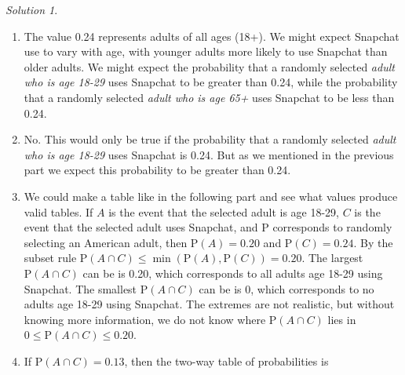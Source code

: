 \documentclass[
  letterpaper,
  DIV=11,
  numbers=noendperiod]{scrreprt}
\theoremstyle{plain}
\theoremstyle{definition}
\theoremstyle{definition}
\theoremstyle{definition}
\theoremstyle{remark}
\newtheorem{refsolution}{Solution}[chapter]
\begin{document}

\begin{tcolorbox}[enhanced jigsaw, opacityback=0, rightrule=.15mm, coltitle=black, colframe=quarto-callout-tip-color-frame, toprule=.15mm, colbacktitle=quarto-callout-tip-color!10!white, opacitybacktitle=0.6, left=2mm, toptitle=1mm, breakable, title={Solution (click to expand)}, bottomtitle=1mm, colback=white, leftrule=.75mm, titlerule=0mm, arc=.35mm, bottomrule=.15mm]

\begin{refsolution}
\leavevmode

\begin{enumerate}
\def\labelenumi{\arabic{enumi}.}
\item
  The value 0.24 represents adults of all ages (18+). We might expect
  Snapchat use to vary with age, with younger adults more likely to use
  Snapchat than older adults. We might expect the probability that a
  randomly selected \emph{adult who is age 18-29} uses Snapchat to be
  greater than 0.24, while the probability that a randomly selected
  \emph{adult who is age 65+} uses Snapchat to be less than 0.24.
\item
  No. This would only be true if the probability that a randomly
  selected \emph{adult who is age 18-29} uses Snapchat is 0.24. But as
  we mentioned in the previous part we expect this probability to be
  greater than 0.24.
\item
  We could make a table like in the following part and see what values
  produce valid tables. If \(A\) is the event that the selected adult is
  age 18-29, \(C\) is the event that the selected adult uses Snapchat,
  and \(\textrm{P}\) corresponds to randomly selecting an American
  adult, then \(\textrm{P}(A) = 0.20\) and \(\textrm{P}(C) = 0.24\). By
  the subset rule
  \(\textrm{P}(A\cap C)\le \min(\textrm{P}(A), \textrm{P}(C)) = 0.20\).
  The largest \(\textrm{P}(A\cap C)\) can be is 0.20, which corresponds
  to all adults age 18-29 using Snapchat. The smallest
  \(\textrm{P}(A \cap C)\) can be is 0, which corresponds to no adults
  age 18-29 using Snapchat. The extremes are not realistic, but without
  knowing more information, we do not know where \(\textrm{P}(A\cap C)\)
  lies in \(0\le \textrm{P}(A \cap C) \le 0.20\).\\
\item
  If \(\textrm{P}(A \cap C)= 0.13\), then the two-way table of
  probabilities\footnotemark{} is


\end{enumerate}
\end{refsolution}
\end{tcolorbox}
\end{document}
